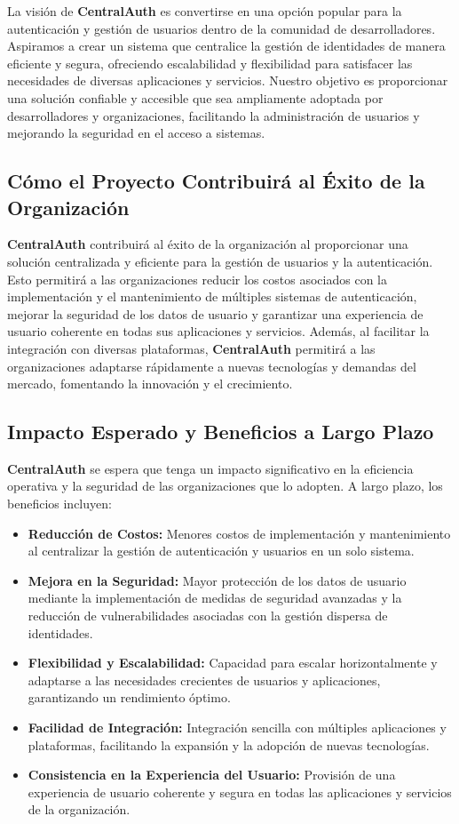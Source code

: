 \documentclass{article}
\begin{document}
La visión de \textbf{CentralAuth} es convertirse en una opción popular para la autenticación y gestión de usuarios dentro de la comunidad de desarrolladores. Aspiramos a crear un sistema que centralice la gestión de identidades de manera eficiente y segura, ofreciendo escalabilidad y flexibilidad para satisfacer las necesidades de diversas aplicaciones y servicios. Nuestro objetivo es proporcionar una solución confiable y accesible que sea ampliamente adoptada por desarrolladores y organizaciones, facilitando la administración de usuarios y mejorando la seguridad en el acceso a sistemas.

\subsection{Cómo el Proyecto Contribuirá al Éxito de la Organización}

\textbf{CentralAuth} contribuirá al éxito de la organización al proporcionar una solución centralizada y eficiente para la gestión de usuarios y la autenticación. Esto permitirá a las organizaciones reducir los costos asociados con la implementación y el mantenimiento de múltiples sistemas de autenticación, mejorar la seguridad de los datos de usuario y garantizar una experiencia de usuario coherente en todas sus aplicaciones y servicios. Además, al facilitar la integración con diversas plataformas, \textbf{CentralAuth} permitirá a las organizaciones adaptarse rápidamente a nuevas tecnologías y demandas del mercado, fomentando la innovación y el crecimiento.

\subsection{Impacto Esperado y Beneficios a Largo Plazo}

\textbf{CentralAuth} se espera que tenga un impacto significativo en la eficiencia operativa y la seguridad de las organizaciones que lo adopten. A largo plazo, los beneficios incluyen:

\begin{itemize}
    \item \textbf{Reducción de Costos:} Menores costos de implementación y mantenimiento al centralizar la gestión de autenticación y usuarios en un solo sistema.
    \item \textbf{Mejora en la Seguridad:} Mayor protección de los datos de usuario mediante la implementación de medidas de seguridad avanzadas y la reducción de vulnerabilidades asociadas con la gestión dispersa de identidades.
    \item \textbf{Flexibilidad y Escalabilidad:} Capacidad para escalar horizontalmente y adaptarse a las necesidades crecientes de usuarios y aplicaciones, garantizando un rendimiento óptimo.
    \item \textbf{Facilidad de Integración:} Integración sencilla con múltiples aplicaciones y plataformas, facilitando la expansión y la adopción de nuevas tecnologías.
    \item \textbf{Consistencia en la Experiencia del Usuario:} Provisión de una experiencia de usuario coherente y segura en todas las aplicaciones y servicios de la organización.
\end{itemize}
\newpage
\end{document}
